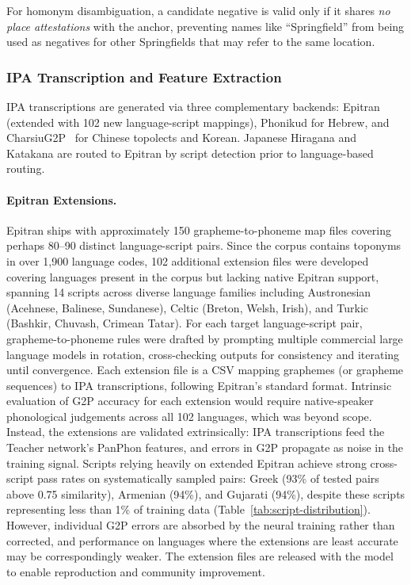 \documentclass[11pt,a4paper]{article}
\begin{document}
For homonym disambiguation, a candidate negative is valid only if it shares \emph{no place attestations} with the anchor, preventing names like ``Springfield'' from being used as negatives for other Springfields that may refer to the same location.

\subsubsection{IPA Transcription and Feature Extraction}
\label{subsec:g2p}

IPA transcriptions are generated via three complementary backends: Epitran~\citep{mortensen2018} (extended with 102 new language-script mappings), Phonikud for Hebrew, and CharsiuG2P~\citep{zhu2022charsiu-g2p} for Chinese topolects and Korean. Japanese Hiragana and Katakana are routed to Epitran by script detection prior to language-based routing.

\paragraph{Epitran Extensions.} Epitran ships with approximately 150 grapheme-to-phoneme map files covering perhaps 80--90 distinct language-script pairs. Since the corpus contains toponyms in over 1,900 language codes, 102 additional extension files were developed covering languages present in the corpus but lacking native Epitran support, spanning 14 scripts across diverse language families including Austronesian (Acehnese, Balinese, Sundanese), Celtic (Breton, Welsh, Irish), and Turkic (Bashkir, Chuvash, Crimean Tatar). For each target language-script pair, grapheme-to-phoneme rules were drafted by prompting multiple commercial large language models in rotation, cross-checking outputs for consistency and iterating until convergence. Each extension file is a CSV mapping graphemes (or grapheme sequences) to IPA transcriptions, following Epitran's standard format. Intrinsic evaluation of G2P accuracy for each extension would require native-speaker phonological judgements across all 102 languages, which was beyond scope. Instead, the extensions are validated extrinsically: IPA transcriptions feed the Teacher network's PanPhon features, and errors in G2P propagate as noise in the training signal. Scripts relying heavily on extended Epitran achieve strong cross-script pass rates on systematically sampled pairs: Greek (93\% of tested pairs above 0.75 similarity), Armenian (94\%), and Gujarati (94\%), despite these scripts representing less than 1\% of training data (Table~\ref{tab:script-distribution}). However, individual G2P errors are absorbed by the neural training rather than corrected, and performance on languages where the extensions are least accurate may be correspondingly weaker. The extension files are released with the model to enable reproduction and community improvement.
\end{document}
